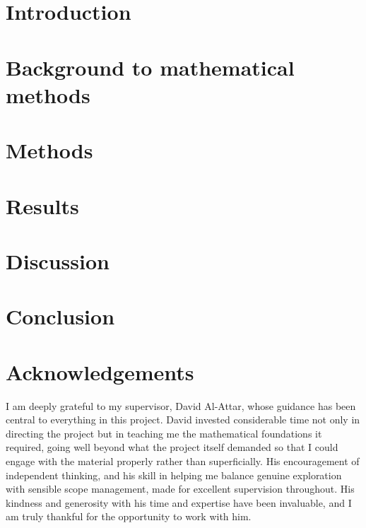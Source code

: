 \documentclass[titlepage, a4paper,12pt, twoside]{article}
\begin{document}




\pagestyle{empty}
\tableofcontents
\newpage
\pagestyle{fancy}

\section{Introduction}


\section{Background to mathematical methods}


\section{Methods}\label{sec:methods}




\section{Results}


\section{Discussion}


\section{Conclusion}


\section{Acknowledgements}

I am deeply grateful to my supervisor, David Al-Attar, whose guidance has been central to everything in this project. David invested considerable time not only in directing the project but in teaching me the mathematical foundations it required, going well beyond what the project itself demanded so that I could engage with the material properly rather than superficially. His encouragement of independent thinking, and his skill in helping me balance genuine exploration with sensible scope management, made for excellent supervision throughout. His kindness and generosity with his time and expertise have been invaluable, and I am truly thankful for the opportunity to work with him.
\end{document}
